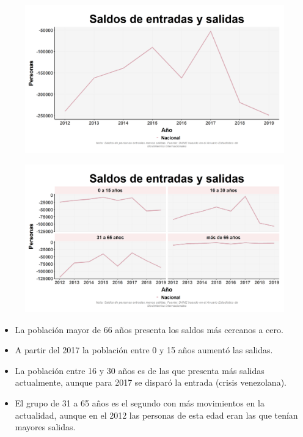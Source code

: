     

    \begin{figure}[H]
        \caption[Saldos de entradas y salidas a nivel nacional ]{\label{saldos_nacional} }
        \begin{center}
        \includegraphics[width=\textwidth,keepaspectratio]{img/var_240_trend.png}
        \end{center}
    \end{figure}

    \begin{figure}[H]
        \caption[Saldos de entradas y salidas a nivel nacional por grupo etéreo ]{\label{saldos_edad} }
        \begin{center}
        \includegraphics[width=\textwidth,keepaspectratio]{img/var_238_trend.png}
        \end{center}
    \end{figure}
            \begin{itemize}
                    \item La población mayor de 66 años presenta los saldos más cercanos a cero.
                    \item A partir del 2017 la población entre 0 y 15 años aumentó las salidas.
                    \item La población entre 16 y 30 años es de las que presenta más salidas actualmente, aunque para 2017 se disparó la entrada (crisis venezolana).
                    \item El grupo de 31 a 65 años es el segundo con más movimientos en la actualidad, aunque en el 2012 las personas de esta edad eran las que tenían mayores salidas.
                    \end{itemize}

